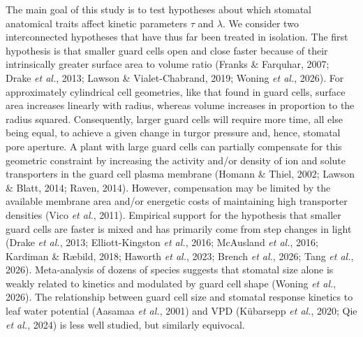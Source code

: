 \documentclass[
  letterpaper,
  DIV=11,
  numbers=noendperiod]{scrartcl}
\providecommand{\DIFaddtex}[1]{{\protect\color{blue}\uwave{#1}}} %
\providecommand{\DIFaddbegin}{} %
\providecommand{\DIFaddend}{} %
\providecommand{\DIFadd}[1]{\texorpdfstring{\DIFaddtex{#1}}{#1}} %
\newcommand{\DIFaddincludegraphics}[2][]{{\color{blue}\fbox{\DIFOincludegraphics[#1]{#2}}}} %
\DeclareRobustCommand{\DIFaddbegin}{\DIFOaddbegin \let\includegraphics\DIFaddincludegraphics} %
\DeclareRobustCommand{\DIFaddend}{\DIFOaddend \let\includegraphics\DIFOincludegraphics} %
\begin{document}
The main goal of this study is to test hypotheses about which stomatal
anatomical traits affect kinetic parameters \(\tau\) and \(\lambda\). We
consider two interconnected hypotheses that have thus far been treated
in isolation. The first hypothesis is that smaller guard cells open and
close faster because of their intrinsically greater surface area to
volume ratio (Franks \& Farquhar, 2007; Drake \emph{et al.}, 2013;
Lawson \& Vialet-Chabrand, 2019; Woning \emph{et al.}, 2026). For
approximately cylindrical cell geometries, like that found in guard
cells, surface area increases linearly with radius, whereas volume
increases in proportion to the radius squared. Consequently, larger
guard cells will require more time, all else being equal, to achieve a
given change in turgor pressure and, hence, stomatal pore aperture. A
plant with large guard cells can partially compensate for this geometric
constraint by increasing the activity and/or density of ion and solute
transporters in the guard cell plasma membrane (Homann \& Thiel, 2002;
Lawson \& Blatt, 2014; Raven, 2014). However, compensation may be
limited by the available membrane area and/or energetic costs of
maintaining high transporter densities (Vico \emph{et al.}, 2011).
Empirical support for the hypothesis that smaller guard cells are faster
is mixed and has primarily come from step changes in light (Drake
\emph{et al.}, 2013; Elliott-Kingston \emph{et al.}, 2016; McAusland
\emph{et al.}, 2016; Kardiman \& Ræbild, 2018; Haworth \emph{et al.},
2023; \DIFaddbegin \DIFadd{Yoshiyama }\emph{\DIFadd{et al.}}\DIFadd{, 2024; }\DIFaddend Brench \emph{et al.}, 2026; Tang
\emph{et al.}, 2026). Meta-analysis of dozens of species suggests that
stomatal size alone is weakly related to kinetics and modulated by guard
cell shape (Woning \emph{et al.}, 2026). The relationship between guard
cell size and stomatal response kinetics to leaf water potential
(Aasamaa \emph{et al.}, 2001) and VPD (Kübarsepp \emph{et al.}, 2020;
Qie \emph{et al.}, 2024) is less well studied, but similarly equivocal.
\end{document}
